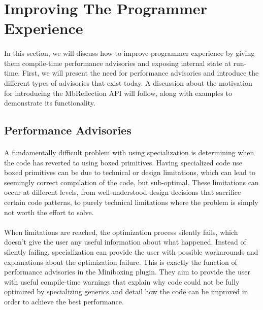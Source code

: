 \section{Improving The Programmer Experience}
\label{sec:advisories}
\paragraph{}
In this section, we will discuss how to improve programmer experience by giving them compile-time performance advisories and exposing internal state at run-time. First, we will present the need for performance advisories and introduce the different types of advisories that exist today. A discussion about the motivation for introducing the MbReflection API will follow, along with examples to demonstrate its functionality.
\subsection{Performance Advisories}
\paragraph{}
A fundamentally difficult problem with using specialization is determining when the code has reverted to using boxed primitives. Having specialized code use boxed primitives can be due to technical or design limitations, which can lead to seemingly correct compilation of the code, but sub-optimal. These limitations can occur at different levels, from well-understood design decisions that sacrifice certain code patterns, to purely technical limitations where the problem is simply not worth the effort to solve.
\paragraph{}
When limitations are reached, the optimization process silently fails, which doesn't give the user any useful information about what happened. Instead of silently failing, specialization can provide the user with possible workarounds and explanations about the optimization failure. This is exactly the function of performance advisories in the Miniboxing plugin. They aim to provide the user with useful compile-time warnings that explain why code could not be fully optimized by specializing generics and detail how the code can be improved in order to achieve the best performance.
